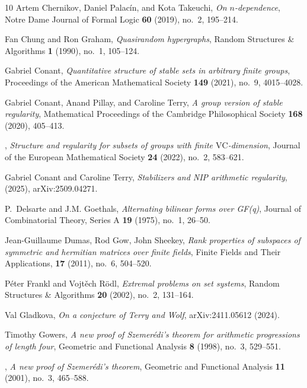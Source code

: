 \documentclass[12pt,oneside,british,a4wide]{amsart}
\numberwithin{equation}{section}
\theoremstyle{definition}
\def\VC{\mathrm{VC}}
\begin{document}
\begin{thebibliography}{10}
Artem Chernikov, Daniel Palac\'in, and Kota Takeuchi, \emph{{On $n$-dependence}},
  Notre Dame Journal of Formal Logic \textbf{60} (2019), no.~2, 195--214.
 

Fan Chung and Ron Graham, \emph{{Quasirandom hypergraphs}}, Random Structures \& Algorithms \textbf{1} (1990), no.~1, 105--124.


Gabriel Conant, \emph{{Quantitative structure of stable sets in arbitrary finite
  groups}}, Proceedings of the American Mathematical Society \textbf{149}
  (2021), no.~9, 4015--4028.


Gabriel Conant, Anand Pillay, and Caroline Terry, \emph{{A group version of
  stable regularity}}, Mathematical Proceedings of the Cambridge Philosophical
  Society \textbf{168} (2020), 405--413.

\bysame, \emph{{Structure and regularity for subsets of groups with finite
  $\VC$-dimension}}, Journal of the European Mathematical Society
  \textbf{24} (2022), no.~2, 583--621.
  
Gabriel Conant and Caroline Terry, \emph{{Stabilizers and NIP arithmetic regularity}}, (2025), arXiv:2509.04271.


P.~Delsarte and J.M. Goethals, \emph{{Alternating bilinear forms over GF(q)}},
  Journal of Combinatorial Theory, Series A \textbf{19} (1975), no.~1, 26--50.
  
Jean-Guillaume Dumas, Rod Gow, John Sheekey, \emph{{Rank properties of subspaces of symmetric and hermitian matrices over finite fields}}, Finite Fields and Their Applications, \textbf{17} (2011), no.~6, 504--520.


P\'eter Frankl and Vojt\v{e}ch R\"odl, \emph{{Extremal problems on set systems}},
  Random Structures \& Algorithms \textbf{20} (2002), no.~2, 131--164.
  
Val Gladkova, \emph{On a conjecture of Terry and Wolf}, arXiv:2411.05612
  (2024).

Timothy Gowers, \emph{{A new proof of Szemer\'edi's theorem for arithmetic
  progressions of length four}}, Geometric and Functional Analysis \textbf{8}
  (1998), no.~3, 529--551.

\bysame, \emph{{A new proof of Szemer\'edi's theorem}}, Geometric and Functional
  Analysis \textbf{11} (2001), no.~3, 465--588.


\end{thebibliography}
\end{document}
